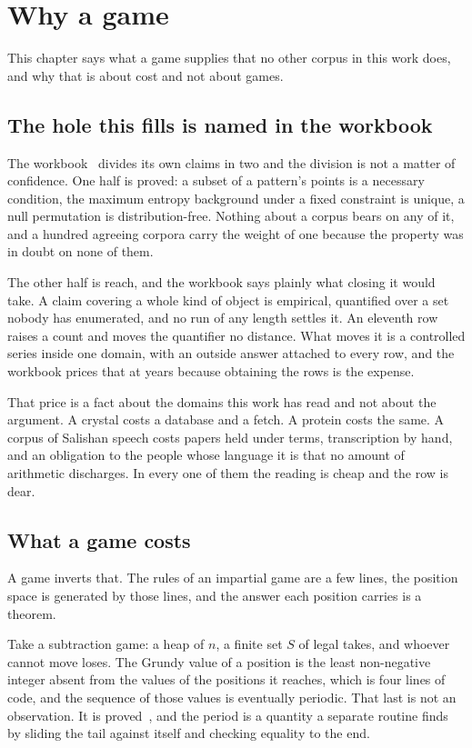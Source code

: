 \chapter{Why a game}

This chapter says what a game supplies that no other corpus in this work does, and why that is
about cost and not about games.


\section{The hole this fills is named in the workbook}

The workbook~\cite{src:Quigg-orior-workbook} divides its own claims in two and the division is not a matter of confidence. One half
is proved: a subset of a pattern's points is a necessary condition, the maximum entropy background
under a fixed constraint is unique, a null permutation is distribution-free. Nothing about a corpus
bears on any of it, and a hundred agreeing corpora carry the weight of one because the property was
in doubt on none of them.

The other half is reach, and the workbook says plainly what closing it would take. A claim covering
a whole kind of object is empirical, quantified over a set nobody has enumerated, and no run of any
length settles it. An eleventh row raises a count and moves the quantifier no distance. What moves
it is a controlled series inside one domain, with an outside answer attached to every row, and the
workbook prices that at years because obtaining the rows is the expense.

That price is a fact about the domains this work has read and not about the argument. A crystal costs
a database and a fetch. A protein costs the same. A corpus of Salishan speech costs papers held
under terms, transcription by hand, and an obligation to the people whose language it is that no
amount of arithmetic discharges. In every one of them the reading is cheap and the row is dear.

\section{What a game costs}

A game inverts that. The rules of an impartial game are a few lines, the position space is generated
by those lines, and the answer each position carries is a theorem.

Take a subtraction game: a heap of \(n\), a finite set \(S\) of legal takes, and whoever cannot move
loses. The Grundy value of a position is the least non-negative integer absent from the values of
the positions it reaches, which is four lines of code, and the sequence of those values is
eventually periodic. That last is not an observation. It is proved~\cite{src:Berlekamp-Conway-and-Guy-1982}, and the period is a quantity a
separate routine finds by sliding the tail against itself and checking equality to the end.

